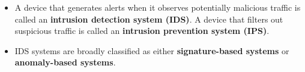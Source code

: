 \begin{itemize}
\item
A device that generates alerts when it observes potentially malicious traffic is called an \textbf{intrusion detection system (IDS)}. A device that filters out suspicious traffic is called an \textbf{intrusion prevention system (IPS)}.

\item
IDS systems are broadly classified as either \textbf{signature-based systems} or \textbf{anomaly-based systems}.

\end{itemize}